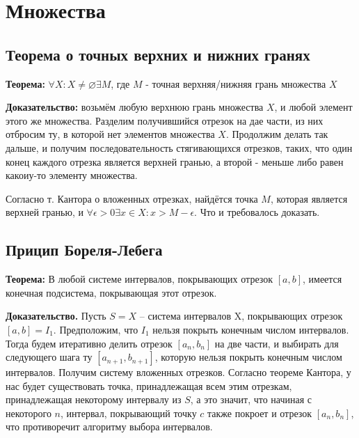 \documentclass{article}
\begin{document}
\section{Множества}

\subsection{Теорема о точных верхних и нижних гранях}

\textbf{Теорема:} $\forall X : X\neq \varnothing \exists M$, где $M$ - точная верхняя/нижняя грань множества $X$

\textbf{Доказательство:} возьмём любую верхнюю грань множества $X$, и любой элемент этого же множества. Разделим получившийся отрезок на дае части, из них отбросим ту, в которой нет элементов множества $X$. Продолжим делать так дальше, и получим последовательность стягивающихся отрезков, таких, что один конец каждого отрезка является верхней гранью, а второй - меньше либо равен какоиу-то элементу множества.

Согласно т. Кантора о вложенных отрезках, найдётся точка $M$, которая является верхней гранью, и $\forall \epsilon > 0 \exists x\in X: x > M-\epsilon$. Что и требовалось доказать.

\subsection{Прицип Бореля-Лебега}

\noindent{}

\textbf{Теорема:} В любой системе интервалов, покрывающих отрезок $[a, b]$, имеется конечная подсистема, покрывающая этот отрезок.

\textbf{Доказательство.} Пусть $S = {X}$ -- система интервалов X, покрывающих отрезок $[a,b] = I_1$. Предположим, что $I_1$ нельзя покрыть конечным числом интервалов. Тогда будем итеративно делить отрезок $[a_n, b_n]$ на две части, и выбирать для следующего шага ту $[a_{n+1}, b_{n+1}]$, которую нельзя покрыть конечным числом интервалов. Получим систему вложенных отрезков. Согласно теореме Кантора, у нас будет существовать точка, принадлежащая всем этим отрезкам, принадлежащая некоторому интервалу из $S$, а это значит, что начиная с некоторого $n$, интервал, покрывающий точку $c$ также покроет и отрезок $[a_n, b_n]$, что противоречит алгоритму выбора интервалов.
\end{document}
